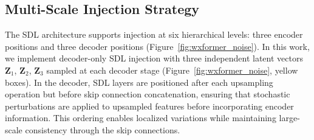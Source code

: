 \documentclass[11pt]{article}
\begin{document}


\subsection{Multi-Scale Injection Strategy}
The SDL architecture supports injection at six hierarchical levels: three encoder positions and three decoder positions (Figure~\ref{fig:wxformer_noise}). In this work, we implement decoder-only SDL injection with three independent latent vectors $\mathbf{Z}_1$, $\mathbf{Z}_2$, $\mathbf{Z}_3$ sampled at each decoder stage (Figure~\ref{fig:wxformer_noise}, yellow boxes). In the decoder, SDL layers are positioned after each upsampling operation but before skip connection concatenation, ensuring that stochastic perturbations are applied to upsampled features before incorporating encoder information. This ordering enables localized variations while maintaining large-scale consistency through the skip connections.
\end{document}
